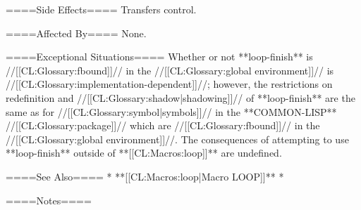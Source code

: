 ====Side Effects====
Transfers control.

====Affected By====
None.

====Exceptional Situations====
Whether or not **loop-finish** is //[[CL:Glossary:fbound]]// in the //[[CL:Glossary:global environment]]// is //[[CL:Glossary:implementation-dependent]]//; however, the restrictions on redefinition and //[[CL:Glossary:shadow|shadowing]]// of **loop-finish** are the same as for //[[CL:Glossary:symbol|symbols]]// in the **COMMON-LISP** //[[CL:Glossary:package]]// which are //[[CL:Glossary:fbound]]// in the //[[CL:Glossary:global environment]]//. The consequences of attempting to use **loop-finish** outside of **[[CL:Macros:loop]]** are undefined.

====See Also====
  * **[[CL:Macros:loop|Macro LOOP]]**
  * {\secref\LoopFacility}

====Notes====

